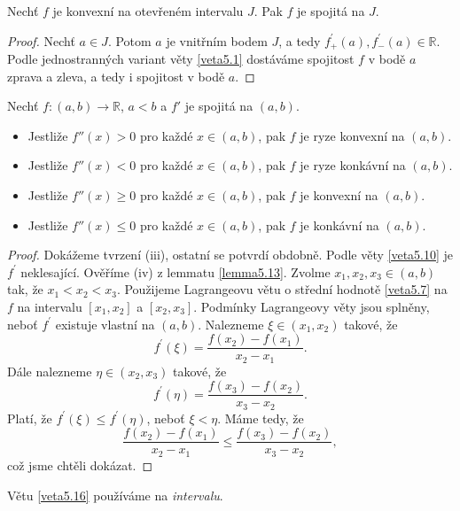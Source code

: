 \begin{veta}\label{veta5.15}
Nechť $f$ je konvexní na otevřeném intervalu $J$. Pak $f$ je spojitá na $J$.
\end{veta}

\begin{proof}
	Nechť $a \in J$. Potom $a$ je vnitřním bodem $J$, a tedy $f_+^\prime(a), f_-^\prime(a) \in \mathbb R $.
	Podle jednostranných variant věty \ref{veta5.1} dostáváme spojitost $f$ v bodě $a$ zprava a zleva, a tedy i spojitost v bodě $a$.
\end{proof}

\begin{veta}\label{veta5.16}
Nechť $f : (a,b) \to \mathbb{R}$, $a<b$ a $f'$ je spojitá na $(a,b)$.
\begin{itemize}
\item Jestliže $f''(x) > 0$ pro každé $x \in (a,b)$, pak $f$ je ryze konvexní na $(a,b)$.
\item Jestliže $f''(x) < 0$ pro každé $x \in (a,b)$, pak $f$ je ryze konkávní na $(a,b)$.
\item Jestliže $f''(x) \geq 0$ pro každé $x \in (a,b)$, pak $f$ je  konvexní na $(a,b)$.
\item Jestliže $f''(x) \leq 0$ pro každé $x \in (a,b)$, pak $f$ je  konkávní na $(a,b)$.
\end{itemize}
\end{veta}

\begin{proof}
	Dokážeme tvrzení (iii), ostatní se potvrdí obdobně. Podle věty \ref{veta5.10} je $f^\prime$ neklesající.
	Ověříme (iv) z lemmatu \ref{lemma5.13}. Zvolme $x_1,x_2,x_3\in (a,b)$ tak, že $x_1<x_2<x_3$.
	Použijeme Lagrangeovu větu o střední hodnotě \ref{veta5.7} na $f$ na intervalu $[x_1, x_2]$ a $[x_2,x_3]$.
	Podmínky Lagrangeovy věty jsou splněny, neboť $f^\prime$ existuje vlastní na $(a,b)$. Nalezneme $\xi \in (x_1,x_2)$
takové, že
$$
f^\prime(\xi) = \frac{f(x_2)-f(x_1)}{x_2-x_1}.
$$
Dále nalezneme $\eta \in (x_2,x_3)$ takové, že
$$
    f^\prime(\eta) = \frac{f(x_3)-f(x_2)}{x_3-x_2}.
$$
Platí, že $f^\prime(\xi) \leq f^\prime(\eta)$, neboť $\xi < \eta$. Máme tedy, že
$$
\frac{f(x_2)-f(x_1)}{x_2-x_1} \leq \frac{f(x_3)-f(x_2)}{x_3-x_2},
$$
což jsme chtěli dokázat.
\end{proof}

\begin{poznamka}[Varování!]
	Větu \ref{veta5.16} používáme na \emph{intervalu}.
\end{poznamka}


